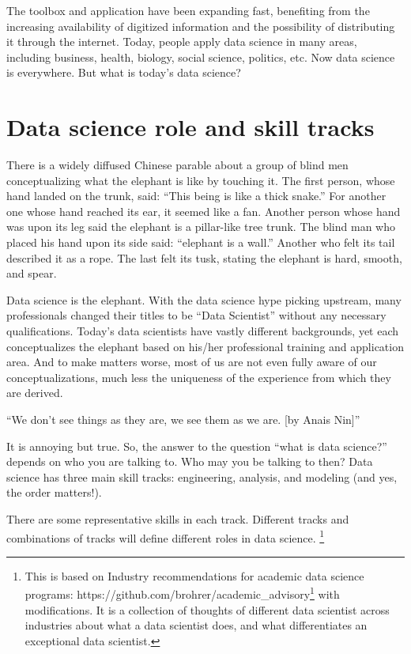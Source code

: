 \documentclass[12pt,]{krantz}
\renewenvironment{quote}{\begin{VF}}{\end{VF}}
\renewcommand{\href}[2]{#2\footnote{\url{#1}}}
\begin{document}
The toolbox and application have been expanding fast, benefiting from the increasing availability of digitized information and the possibility of distributing it through the internet. Today, people apply data science in many areas, including business, health, biology, social science, politics, etc. Now data science is everywhere. But what is today's data science?

\hypertarget{data-science-role-and-skill-tracks}{%
\section{Data science role and skill tracks}\label{data-science-role-and-skill-tracks}}

There is a widely diffused Chinese parable about a group of blind men conceptualizing what the elephant is like by touching it. The first person, whose hand landed on the trunk, said: ``This being is like a thick snake.'' For another one whose hand reached its ear, it seemed like a fan. Another person whose hand was upon its leg said the elephant is a pillar-like tree trunk. The blind man who placed his hand upon its side said: ``elephant is a wall.'' Another who felt its tail described it as a rope. The last felt its tusk, stating the elephant is hard, smooth, and spear.

Data science is the elephant. With the data science hype picking upstream, many professionals changed their titles to be ``Data Scientist'' without any necessary qualifications. Today's data scientists have vastly different backgrounds, yet each conceptualizes the elephant based on his/her professional training and application area. And to make matters worse, most of us are not even fully aware of our conceptualizations, much less the uniqueness of the experience from which they are derived.

\begin{quote}
``We don't see things as they are, we see them as we are. {[}by Anais Nin{]}''
\end{quote}

It is annoying but true. So, the answer to the question ``what is data science?'' depends on who you are talking to. Who may you be talking to then? Data science has three main skill tracks: engineering, analysis, and modeling (and yes, the order matters!).

There are some representative skills in each track. Different tracks and combinations of tracks will define different roles in data science. \footnote{This is based on \href{https://github.com/brohrer/academic_advisory}{Industry recommendations for academic data science programs: https://github.com/brohrer/academic\_advisory} with modifications. It is a collection of thoughts of different data scientist across industries about what a data scientist does, and what differentiates an exceptional data scientist.}
\end{document}
